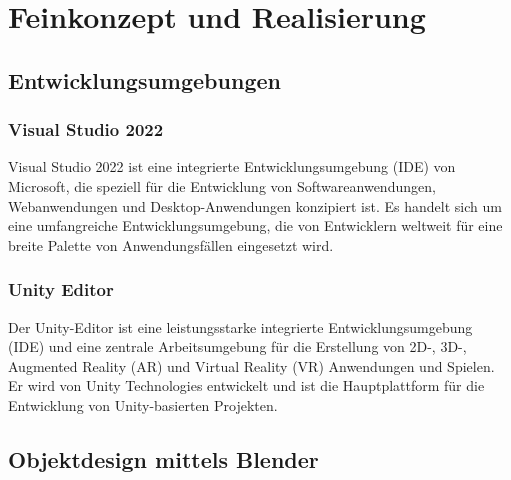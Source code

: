 \setcounter{secnumdepth}{4}

\chapter{Feinkonzept und Realisierung}

\section{Entwicklungsumgebungen}
\subsection{Visual Studio 2022}
Visual Studio 2022 ist eine integrierte Entwicklungsumgebung (IDE) von Microsoft, die speziell für die Entwicklung von
Softwareanwendungen, Webanwendungen und Desktop-Anwendungen konzipiert ist. Es handelt sich um eine umfangreiche
Entwicklungsumgebung, die von Entwicklern weltweit für eine breite Palette von Anwendungsfällen eingesetzt wird.

\subsection{Unity Editor}
Der Unity-Editor ist eine leistungsstarke integrierte Entwicklungsumgebung (IDE) und eine zentrale Arbeitsumgebung
für die Erstellung von 2D-, 3D-, Augmented Reality (AR) und Virtual Reality (VR) Anwendungen und Spielen. Er wird von
Unity Technologies entwickelt und ist die Hauptplattform für die Entwicklung von Unity-basierten Projekten.

\section{Objektdesign mittels Blender}
